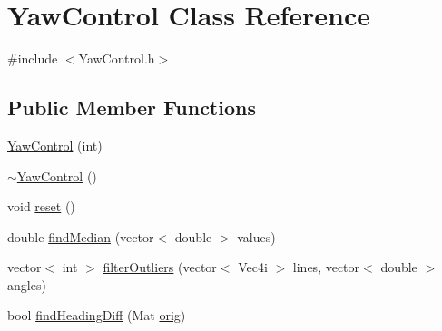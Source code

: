 \hypertarget{classYawControl}{}\section{Yaw\+Control Class Reference}
\label{classYawControl}


{\ttfamily \#include $<$Yaw\+Control.\+h$>$}

\subsection*{Public Member Functions}
\begin{DoxyCompactItemize}
\item 
\hyperlink{classYawControl_ae20ea5eaa17db8a70d6e8dce47fc9b8a}{Yaw\+Control} (int)
\item 
\hyperlink{classYawControl_a7dfc515af1136d1a42f4b475f9615965}{$\sim$\+Yaw\+Control} ()
\item 
void \hyperlink{classYawControl_a312d3e7a6fbfcb1a47fcb6c2e192cd0b}{reset} ()
\item 
double \hyperlink{classYawControl_a2272eb0423c4d58d91024398a1c344ee}{find\+Median} (vector$<$ double $>$ values)
\item 
vector$<$ int $>$ \hyperlink{classYawControl_a869bc2ed2eb11bac73af7b79e7ff07a2}{filter\+Outliers} (vector$<$ Vec4i $>$ lines, vector$<$ double $>$ angles)
\item 
bool \hyperlink{classYawControl_aca17af0cb08f59e1115ed5c43312d684}{find\+Heading\+Diff} (Mat \hyperlink{classYawControl_a462e793d0950d099f9744d72559f9471}{orig})
\end{DoxyCompactItemize}
